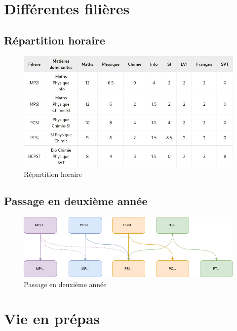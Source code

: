 \documentclass[aspectratio=169]{beamer}
\begin{document}
\section{Différentes filières}

\subsection{Répartition horaire}

\begin{frame}
    \begin{figure}
        \centering
        \includegraphics[width=\textwidth]{ressource_diapo/prepas.png}
        \caption{Répartition horaire}
    \end{figure}
\end{frame}

\subsection{Passage en deuxième année}

\begin{frame}
    \begin{figure}
        \centering
        \includegraphics[width=\textwidth]{ressource_diapo/deuxieme_annee.png}
        \caption{Passage en deuxième année}
    \end{figure}
\end{frame}

\section{Vie en prépas}
\end{document}
